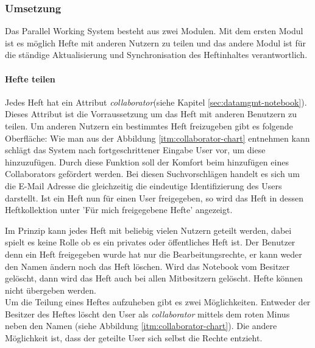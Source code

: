 \subsubsection{Umsetzung}
Das Parallel Working System besteht aus zwei Modulen. Mit dem ersten Modul ist es möglich Hefte mit anderen Nutzern zu teilen und das andere Modul ist für die ständige Aktualisierung und Synchronisation des Heftinhaltes verantwortlich. 
\paragraph{Hefte teilen}
Jedes Heft hat ein Attribut \textit{collaborator}(siehe Kapitel \ref{sec:datamgmt-notebook}). Dieses Attribut ist die Vorraussetzung um das Heft mit anderen Benutzern zu teilen. 
Um anderen Nutzern ein bestimmtes Heft freizugeben gibt es folgende Oberfläche:
Wie man aus der Abbildung \ref{itm:collaborator-chart} entnehmen kann schlägt das System nach fortgeschrittener Eingabe User vor, um diese hinzuzufügen. Durch diese Funktion soll der Komfort beim hinzufügen eines Collaborators gefördert werden. Bei diesen Suchvorschlägen handelt es sich um die E-Mail Adresse die gleichzeitig die eindeutige Identifizierung des Users darstellt.
Ist ein Heft nun für einen User freigegeben, so wird das Heft in dessen Heftkollektion unter 'Für mich freigegebene Hefte' angezeigt. \\


Im Prinzip kann jedes Heft mit beliebig vielen Nutzern geteilt werden, dabei spielt es keine Rolle ob es ein privates oder öffentliches Heft ist. 
Der Benutzer denn ein Heft freigegeben wurde hat nur die Bearbeitungsrechte, er kann weder den Namen ändern noch das Heft löschen. Wird das Notebook vom Besitzer gelöscht, dann wird das Heft auch bei allen Mitbesitzern gelöscht. Hefte können nicht übergeben werden.
\\
Um die Teilung eines Heftes aufzuheben gibt es zwei Möglichkeiten. Entweder der Besitzer des Heftes löscht den User als \textit{collaborator} mittels dem roten Minus neben den Namen (siehe Abbildung \ref{itm:collaborator-chart}). Die andere Möglichkeit ist, dass der geteilte User sich selbst die Rechte entzieht.
